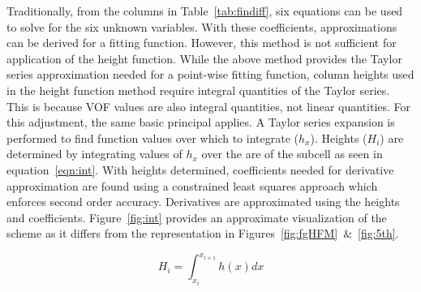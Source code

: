 Traditionally, from the columns in Table~\ref{tab:findiff}, six equations can be used to solve for the six unknown variables. With these coefficients, approximations can be derived for a fitting function. However, this method is not sufficient for application of the height function. While the above method provides the Taylor series approximation needed for a point-wise fitting function, column heights used in the height function method require integral quantities of the Taylor series. This is because VOF values are also integral quantities, not linear quantities. For this adjustment, the same basic principal applies. A Taylor series expansion is performed to find function values over which to integrate ($h_x$). Heights ($H_i$) are determined by integrating values of $h_x$ over the are of the subcell as seen in equation~\ref{eqn:int}. With heights determined, coefficients needed for derivative approximation are found using a constrained least squares approach which enforces second order accuracy. Derivatives are approximated using the heights and coefficients. Figure~\ref{fig:int} provides an approximate visualization of the scheme as it differs from the representation in Figures~\ref{fig:fgHFM}~\&~\ref{fig:5th}.

\begin{equation}
H_i = \int_{x_i}^{x_{i+1}} h(x) dx
\label{eqn:int}
\end{equation}

